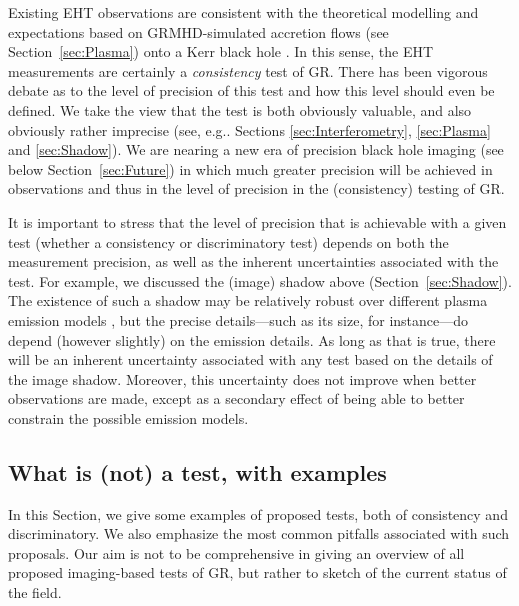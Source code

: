 \documentclass[graybox,envcountchap]{svmult}
\begin{document}
\bigskip

Existing EHT observations are consistent with the theoretical modelling and expectations based on GRMHD-simulated accretion flows (see Section~\ref{sec:Plasma}) onto a Kerr black hole \cite{EHT2019I,EHT2019VI}.
In this sense, the EHT measurements are certainly a \emph{consistency} test of GR.
There has been vigorous debate as to the level of precision of this test \cite{Gralla2021} and how this level should even be defined.
We take the view that the test is both obviously valuable, and also obviously rather imprecise (see, e.g.. Sections \ref{sec:Interferometry}, \ref{sec:Plasma} and \ref{sec:Shadow}).
We are nearing a new era of precision black hole imaging (see below Section~\ref{sec:Future}) in which much greater precision will be achieved in observations and thus in the level of precision in the (consistency) testing of GR.

\bigskip

It is important to stress that the level of precision that is achievable with a given test (whether a consistency or discriminatory test) depends on both the measurement precision, as well as the inherent uncertainties associated with the test.
For example, we discussed the (image) shadow above (Section~\ref{sec:Shadow}).
The existence of such a shadow may be relatively robust over different plasma emission models \cite{Bronzwaer2021}, but the precise details---such as its size, for instance---do depend (however slightly) on the emission details.
As long as that is true, there will be an inherent uncertainty associated with any test based on the details of the image shadow.
Moreover, this uncertainty does not improve when better observations are made, except as a secondary effect of being able to better constrain the possible emission models.

\subsection{What is (not) a test, with examples}\label{sec:testexamples}

In this Section, we give some examples of proposed tests, both of consistency and discriminatory.
We also emphasize the most common pitfalls associated with such proposals.
Our aim is not to be comprehensive in giving an overview of all proposed imaging-based tests of GR, but rather to sketch of the current status of the field.

\bigskip
\end{document}
